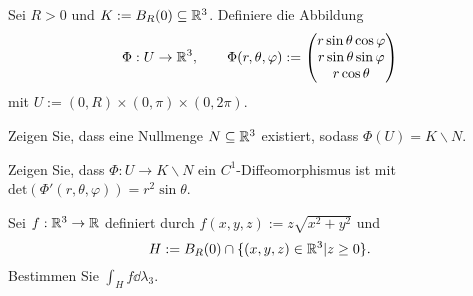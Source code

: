 \begin{Problem}\label{pr:advanalblatt10-2}
	Sei $R>0$ und $K:=B_R(0)\subseteq \mathbb{R}^3$. Definiere die Abbildung
	\[
	\Phi:U\to \mathbb{R}^3,\qquad\Phi(r,\theta,\varphi):=\begin{pmatrix} r\sin\theta\cos\varphi \\ r\sin\theta\sin\varphi \\ r\cos\theta \end{pmatrix} 
\]
mit $U:=(0,R)\times (0,\pi)\times(0,2\pi)$.
\begin{parts}
\item Zeigen Sie, dass eine Nullmenge $N\subseteq \mathbb{R}^3$ existiert, sodass $\Phi(U)=K\backslash N$.
\item Zeigen Sie, dass $\Phi:U\to K\backslash N$ ein $C^1$-Diffeomorphismus ist mit $\text{det}(\Phi'(r,\theta,\varphi))=r^2\sin\theta$.
\item Sei $f:\mathbb{R}^3\to \mathbb{R}$ definiert durch $f(x,y,z):=z\sqrt{x^2+y^2} $ und
	\[
	H:=B_R(0)\cap \{(x,y,z)\in \mathbb{R}^3|z\ge 0\} 
	.\] 
	Bestimmen Sie $\int_H f\dd{\lambda_3}$.
\end{parts}
\end{Problem}
